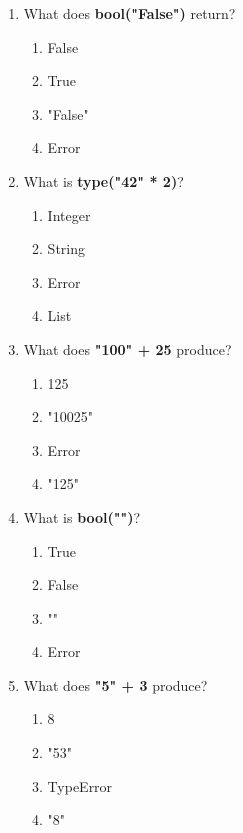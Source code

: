 \documentclass{article}
\begin{document}
\begin{multicols*}{4}
\begin{enumerate}
        \item What does \textbf{bool("False")} return?
        \begin{enumerate}[label=(\Alph*)]
            \item False
            \item True
            \item "False"
            \item Error
        \end{enumerate}

        \item What is \textbf{type("42" * 2)}?
        \begin{enumerate}[label=(\Alph*)]
            \item Integer
            \item String
            \item Error
            \item List
        \end{enumerate}

        \item What does \textbf{"100" + 25} produce?
        \begin{enumerate}[label=(\Alph*)]
            \item 125
            \item "10025"
            \item Error
            \item "125"
        \end{enumerate}

        \item What is \textbf{bool("")}?
        \begin{enumerate}[label=(\Alph*)]
            \item True
            \item False
            \item ""
            \item Error
        \end{enumerate}


        \item What does \textbf{"5" + 3} produce?
        \begin{enumerate}[label=(\Alph*)]
            \item 8
            \item "53"
            \item TypeError
            \item "8"
        \end{enumerate}


\end{enumerate}
\end{multicols*}
\end{document}
